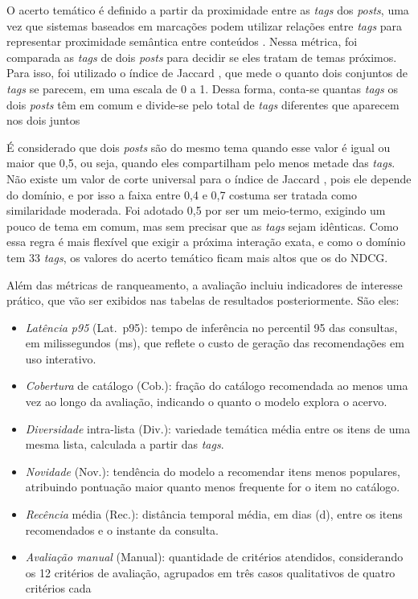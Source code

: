 \documentclass[a4paper,12pt]{article}
\begin{document}
{O acerto temático é definido a partir da proximidade entre as \textit{tags} dos \textit{posts}, uma vez que sistemas baseados em marcações podem utilizar relações entre \textit{tags} para representar proximidade semântica entre conteúdos \cite{cattuto2008semantic}. Nessa métrica, foi comparada as \textit{tags} de dois \textit{posts} para decidir se eles tratam de temas próximos. Para isso, foi utilizado o índice de Jaccard \cite{Niwattanakul2013Jaccard}, que mede o quanto dois conjuntos de \textit{tags} se parecem, em uma escala de 0 a 1. Dessa forma, conta-se quantas \textit{tags} os dois \textit{posts} têm em comum e divide-se pelo total de \textit{tags} diferentes que aparecem nos dois juntos

É considerado que dois \textit{posts} são do mesmo tema quando esse valor é igual ou maior que 0,5, ou seja, quando eles compartilham pelo menos metade das \textit{tags}. Não existe um valor de corte universal para o índice de Jaccard \cite{Niwattanakul2013Jaccard}, pois ele depende do domínio, e por isso a faixa entre 0,4 e 0,7 costuma ser tratada como similaridade moderada. Foi adotado 0,5 por ser um meio-termo, exigindo um pouco de tema em comum, mas sem precisar que as \textit{tags} sejam idênticas. Como essa regra é mais flexível que exigir a próxima interação exata, e como o domínio tem 33 \textit{tags}, os valores do acerto temático ficam mais altos que os do NDCG.


Além das métricas de ranqueamento, a avaliação incluiu indicadores de interesse prático, que vão ser exibidos nas tabelas de resultados posteriormente. São eles:



\begin{itemize}
    \item[a)] \textit{Latência p95} (Lat.\ p95): tempo de inferência no percentil 95 das consultas, em milissegundos (ms), que reflete o custo de geração das recomendações em uso interativo.
    \item[b)] \textit{Cobertura} de catálogo (Cob.): fração do catálogo recomendada ao menos uma vez ao longo da avaliação, indicando o quanto o modelo explora o acervo.
    \item[c)] \textit{Diversidade} intra-lista (Div.): variedade temática média entre os itens de uma mesma lista, calculada a partir das \textit{tags}.
    \item[d)] \textit{Novidade} (Nov.): tendência do modelo a recomendar itens menos populares, atribuindo pontuação maior quanto menos frequente for o item no catálogo.
    \item[e)] \textit{Recência} média (Rec.): distância temporal média, em dias (d), entre os itens recomendados e o instante da consulta.
    \item[f)] \textit{Avaliação manual} (Manual): quantidade de critérios atendidos, considerando os 12 critérios de avaliação, agrupados em três casos qualitativos de quatro critérios cada
\end{itemize}

}
\end{document}
